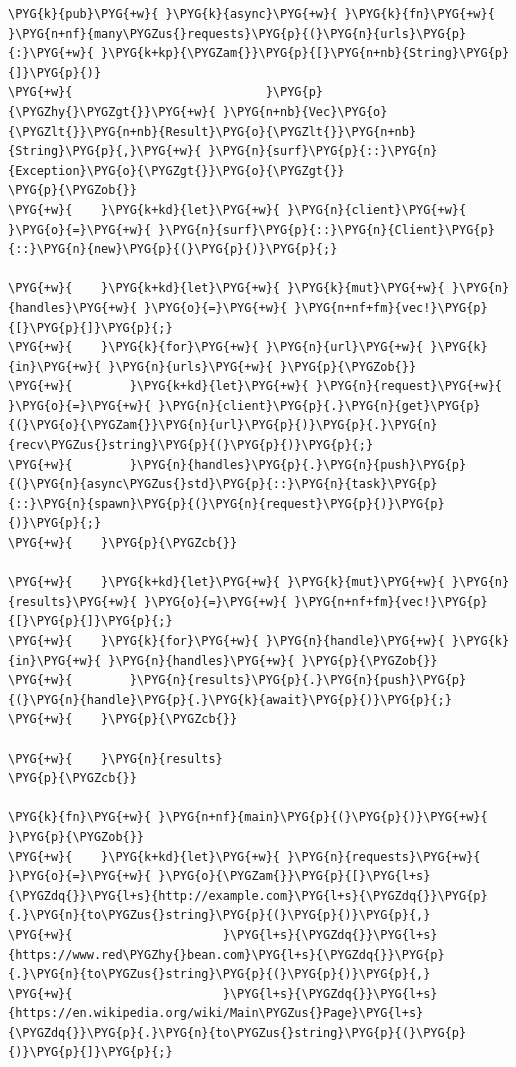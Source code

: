 \begin{Verbatim}[commandchars=\\\{\},breaklines=true,breakanywhere=true,fontsize=\codefont,xleftmargin=17bp]
\PYG{k}{pub}\PYG{+w}{ }\PYG{k}{async}\PYG{+w}{ }\PYG{k}{fn}\PYG{+w}{ }\PYG{n+nf}{many\PYGZus{}requests}\PYG{p}{(}\PYG{n}{urls}\PYG{p}{:}\PYG{+w}{ }\PYG{k+kp}{\PYGZam{}}\PYG{p}{[}\PYG{n+nb}{String}\PYG{p}{]}\PYG{p}{)}
\PYG{+w}{                           }\PYG{p}{\PYGZhy{}\PYGZgt{}}\PYG{+w}{ }\PYG{n+nb}{Vec}\PYG{o}{\PYGZlt{}}\PYG{n+nb}{Result}\PYG{o}{\PYGZlt{}}\PYG{n+nb}{String}\PYG{p}{,}\PYG{+w}{ }\PYG{n}{surf}\PYG{p}{::}\PYG{n}{Exception}\PYG{o}{\PYGZgt{}}\PYG{o}{\PYGZgt{}}
\PYG{p}{\PYGZob{}}
\PYG{+w}{    }\PYG{k+kd}{let}\PYG{+w}{ }\PYG{n}{client}\PYG{+w}{ }\PYG{o}{=}\PYG{+w}{ }\PYG{n}{surf}\PYG{p}{::}\PYG{n}{Client}\PYG{p}{::}\PYG{n}{new}\PYG{p}{(}\PYG{p}{)}\PYG{p}{;}

\PYG{+w}{    }\PYG{k+kd}{let}\PYG{+w}{ }\PYG{k}{mut}\PYG{+w}{ }\PYG{n}{handles}\PYG{+w}{ }\PYG{o}{=}\PYG{+w}{ }\PYG{n+nf+fm}{vec!}\PYG{p}{[}\PYG{p}{]}\PYG{p}{;}
\PYG{+w}{    }\PYG{k}{for}\PYG{+w}{ }\PYG{n}{url}\PYG{+w}{ }\PYG{k}{in}\PYG{+w}{ }\PYG{n}{urls}\PYG{+w}{ }\PYG{p}{\PYGZob{}}
\PYG{+w}{        }\PYG{k+kd}{let}\PYG{+w}{ }\PYG{n}{request}\PYG{+w}{ }\PYG{o}{=}\PYG{+w}{ }\PYG{n}{client}\PYG{p}{.}\PYG{n}{get}\PYG{p}{(}\PYG{o}{\PYGZam{}}\PYG{n}{url}\PYG{p}{)}\PYG{p}{.}\PYG{n}{recv\PYGZus{}string}\PYG{p}{(}\PYG{p}{)}\PYG{p}{;}
\PYG{+w}{        }\PYG{n}{handles}\PYG{p}{.}\PYG{n}{push}\PYG{p}{(}\PYG{n}{async\PYGZus{}std}\PYG{p}{::}\PYG{n}{task}\PYG{p}{::}\PYG{n}{spawn}\PYG{p}{(}\PYG{n}{request}\PYG{p}{)}\PYG{p}{)}\PYG{p}{;}
\PYG{+w}{    }\PYG{p}{\PYGZcb{}}

\PYG{+w}{    }\PYG{k+kd}{let}\PYG{+w}{ }\PYG{k}{mut}\PYG{+w}{ }\PYG{n}{results}\PYG{+w}{ }\PYG{o}{=}\PYG{+w}{ }\PYG{n+nf+fm}{vec!}\PYG{p}{[}\PYG{p}{]}\PYG{p}{;}
\PYG{+w}{    }\PYG{k}{for}\PYG{+w}{ }\PYG{n}{handle}\PYG{+w}{ }\PYG{k}{in}\PYG{+w}{ }\PYG{n}{handles}\PYG{+w}{ }\PYG{p}{\PYGZob{}}
\PYG{+w}{        }\PYG{n}{results}\PYG{p}{.}\PYG{n}{push}\PYG{p}{(}\PYG{n}{handle}\PYG{p}{.}\PYG{k}{await}\PYG{p}{)}\PYG{p}{;}
\PYG{+w}{    }\PYG{p}{\PYGZcb{}}

\PYG{+w}{    }\PYG{n}{results}
\PYG{p}{\PYGZcb{}}

\PYG{k}{fn}\PYG{+w}{ }\PYG{n+nf}{main}\PYG{p}{(}\PYG{p}{)}\PYG{+w}{ }\PYG{p}{\PYGZob{}}
\PYG{+w}{    }\PYG{k+kd}{let}\PYG{+w}{ }\PYG{n}{requests}\PYG{+w}{ }\PYG{o}{=}\PYG{+w}{ }\PYG{o}{\PYGZam{}}\PYG{p}{[}\PYG{l+s}{\PYGZdq{}}\PYG{l+s}{http://example.com}\PYG{l+s}{\PYGZdq{}}\PYG{p}{.}\PYG{n}{to\PYGZus{}string}\PYG{p}{(}\PYG{p}{)}\PYG{p}{,}
\PYG{+w}{                     }\PYG{l+s}{\PYGZdq{}}\PYG{l+s}{https://www.red\PYGZhy{}bean.com}\PYG{l+s}{\PYGZdq{}}\PYG{p}{.}\PYG{n}{to\PYGZus{}string}\PYG{p}{(}\PYG{p}{)}\PYG{p}{,}
\PYG{+w}{                     }\PYG{l+s}{\PYGZdq{}}\PYG{l+s}{https://en.wikipedia.org/wiki/Main\PYGZus{}Page}\PYG{l+s}{\PYGZdq{}}\PYG{p}{.}\PYG{n}{to\PYGZus{}string}\PYG{p}{(}\PYG{p}{)}\PYG{p}{]}\PYG{p}{;}


\end{Verbatim}
